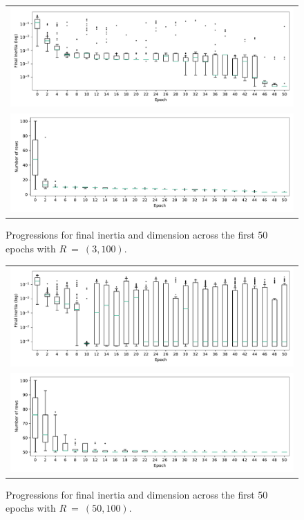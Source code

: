 \documentclass[smallextended]{svjour3}
\newlength{\imgwidth}
\begin{document}
\addtocounter{figure}{1}
\begin{figure}[htbp]
    \ContinuedFloat%
    \centering
    \begin{tabular}{c}
        \includegraphics[width=\imgwidth]{Fig7a-1.pdf}
        \\
        \includegraphics[width=\imgwidth]{Fig7a-2.pdf}
    \end{tabular}
    \caption{%
        Progressions for final inertia and dimension across the first 50
        epochs with \(R~=~(3,100)\).
    }\label{fig:small-inertia-50}
\end{figure}

\begin{figure}[htbp]
    \ContinuedFloat%
    \centering
    \begin{tabular}{c}
        \includegraphics[width=\imgwidth]{Fig7b-1.pdf}
        \\
        \includegraphics[width=\imgwidth]{Fig7b-2.pdf}
    \end{tabular}
    \caption{%
        Progressions for final inertia and dimension across the first 50 epochs
        with \(R~=~(50,100)\).
    }\label{fig:large-inertia-50}
\end{figure}
\end{document}

